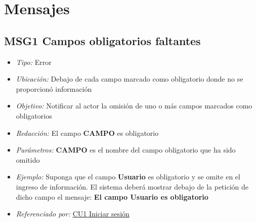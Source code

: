 
\pagebreak
\section{Mensajes}

	\hypertarget{MSG1:CamposObligatorios}{}
	\subsection{MSG1 Campos obligatorios faltantes}

		\begin{itemize}

			\item \textit{Tipo:} Error

			\item\textit{Ubicación:}  Debajo de cada campo marcado como obligatorio donde no se proporcionó información

			\item \textit{Objetivo:} Notificar al actor la omisión de uno o más campos marcados como obligatorios

			\item \textit{Redacción:} El campo \textbf{CAMPO} es obligatorio

			\item \textit{Parámetros:} \textbf{CAMPO} es el nombre del campo obligatorio que ha sido omitido

			\item \textit{Ejemplo:} Suponga que el campo \textbf{Usuario} es obligatorio y se omite en el ingreso de información. El sistema deberá mostrar debajo de la petición de dicho campo el mensaje: \textbf{El campo Usuario es obligatorio}

			\item \textit{Referenciado por:} \hyperlink{CU1}{CU1 Iniciar sesión}

		\end{itemize}
